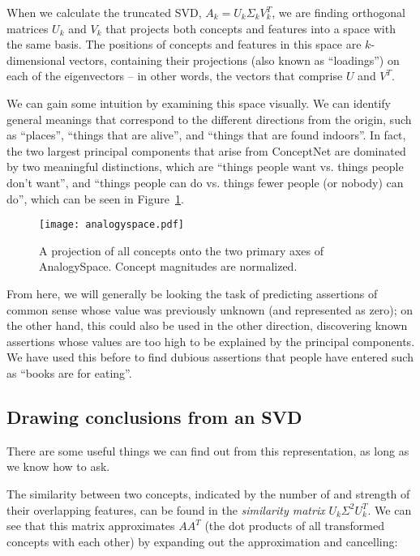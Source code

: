 \documentclass[11pt]{article}
\begin{document}
When we calculate the truncated SVD, $A_k = U_k \Sigma_k V^T_k$, we are finding
orthogonal matrices $U_k$ and $V_k$ that 
projects both concepts and features into a
space with the same basis. The positions of concepts and features in this space
are $k$-dimensional vectors, containing their projections (also known as
``loadings'') on each of the eigenvectors -- in other words, the vectors that
comprise $U$ and $V^T$.

We can gain some intuition by examining this space visually. We can identify
general meanings that correspond to the different directions from the origin,
such as ``places'', ``things that are alive'', and ``things
that are found indoors''. In fact, the two largest principal components that
arise from ConceptNet are dominated by two meaningful distinctions, which are
``things people want vs. things people don't want'', and ``things people can do
vs. things fewer people (or nobody) can do'', which can be seen in
Figure~\ref{fig:analogyspace}.

\begin{figure}[h]
\begin{center}
\texttt{[image: analogyspace.pdf]}
\end{center}
\vspace{-2em}
\caption{A projection of all concepts onto the two primary axes of
AnalogySpace. Concept magnitudes are normalized.}
\label{fig:analogyspace}
\end{figure}

From here, we will generally be looking the task of predicting
assertions of common sense whose value was previously unknown (and represented
as zero); on the other hand, this could also be used in the other direction,
discovering known assertions whose values are too high to be explained by the
principal components. We have used this before to find dubious assertions that
people have entered such as ``books are for eating''.

\subsection{Drawing conclusions from an SVD}

There are some useful things we can find out from this representation, as long
as we know how to ask.

The similarity between two concepts, indicated by the number of and strength of
their overlapping features, can be found in the {\em similarity matrix} $U_k
\Sigma^2 U_k^T$. We can see that this matrix approximates $AA^T$ (the dot
products of all transformed concepts with each other) by expanding out the
approximation and cancelling:
\end{document}
